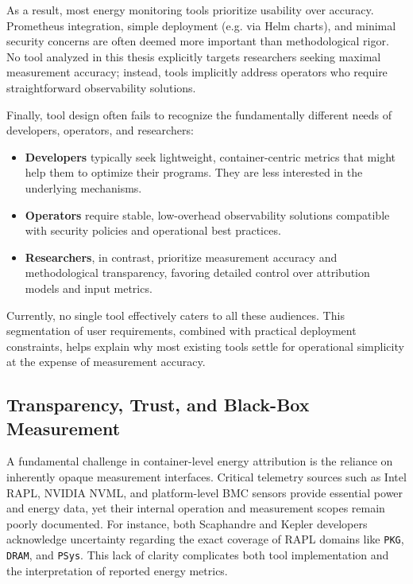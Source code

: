 As a result, most energy monitoring tools prioritize usability over accuracy. Prometheus integration, simple deployment (e.g. via Helm charts), and minimal security concerns are often deemed more important than methodological rigor. No tool analyzed in this thesis explicitly targets researchers seeking maximal measurement accuracy; instead, tools implicitly address operators who require straightforward observability solutions.

Finally, tool design often fails to recognize the fundamentally different needs of developers, operators, and researchers:
\begin{itemize}
    \item \textbf{Developers} typically seek lightweight, container-centric metrics that might help them to optimize their programs. They are less interested in the underlying mechanisms.
    \item \textbf{Operators} require stable, low-overhead observability solutions compatible with security policies and operational best practices.
    \item \textbf{Researchers}, in contrast, prioritize measurement accuracy and methodological transparency, favoring detailed control over attribution models and input metrics.
\end{itemize}

Currently, no single tool effectively caters to all these audiences. This segmentation of user requirements, combined with practical deployment constraints, helps explain why most existing tools settle for operational simplicity at the expense of measurement accuracy.

\subsection{Transparency, Trust, and Black-Box Measurement}

A fundamental challenge in container-level energy attribution is the reliance on inherently opaque measurement interfaces. Critical telemetry sources such as Intel RAPL, NVIDIA NVML, and platform-level BMC sensors provide essential power and energy data, yet their internal operation and measurement scopes remain poorly documented. For instance, both Scaphandre and Kepler developers acknowledge uncertainty regarding the exact coverage of RAPL domains like \texttt{PKG}, \texttt{DRAM}, and \texttt{PSys}. This lack of clarity complicates both tool implementation and the interpretation of reported energy metrics.

